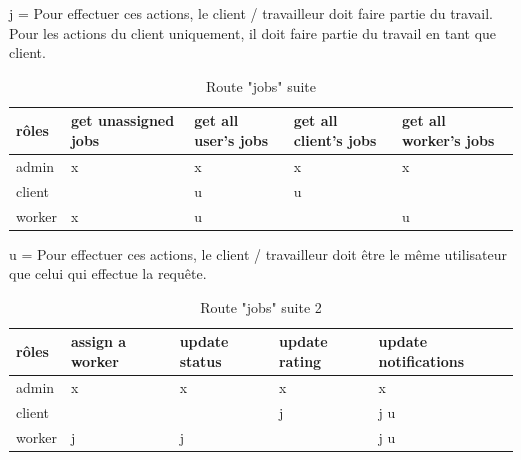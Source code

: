 \documentclass[
    iai, %
    il, %
]{heig-tb}
\begin{document}
j = Pour effectuer ces actions, le client / travailleur doit faire partie du travail. \\
Pour les actions du client uniquement, il doit faire partie du travail en tant que client.


\begin{table}[h]
    \begin{center}
        \caption{Route "jobs" suite \label{autorisations-route-jobs-other-get}}
        \begin{tabularx}{1.0\textwidth} {X|X}
            rôles  & get unassigned jobs & get all user's jobs & get all client's jobs & get all worker's jobs \\ \hline
            admin  & x                   & x                   & x                     & x                     \\
            client &                     & u                   & u                     &                       \\
            worker & x                   & u                   &                       & u                     \\
        \end{tabularx}
    \end{center}
\end{table}

u = Pour effectuer ces actions, le client / travailleur doit être le même utilisateur que celui qui effectue la requête.

\begin{table}[h]
    \begin{center}
        \caption{Route "jobs" suite 2\label{autorisations-route-jobs-updates}}
        \begin{tabularx}{1.0\textwidth} {X|X}
            rôles  & assign a worker & update status & update rating & update notifications \\ \hline
            admin  & x               & x             & x             & x                    \\
            client &                 &               & j             & j u                  \\
            worker & j               & j             &               & j u                  \\
        \end{tabularx}
    \end{center}
\end{table}
\end{document}
